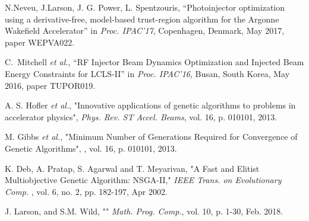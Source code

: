 \documentclass[letterpaper,  %
              ]{jacow-2_3}   %
\begin{document}
\begin{thebibliography}{99}
N.Neveu, J.Larson, J. G. Power, L. Spentzouris, 
“Photoinjector optimization using a derivative-free, model-based trust-region algorithm for the Argonne Wakefield Accelerator”
in \textit{Proc. IPAC’17}, 
Copenhagen, Denmark, May 2017, 
paper WEPVA022.

C.~Mitchell \emph{et al.}, “RF Injector Beam Dynamics Optimization 
and Injected Beam Energy Constraints for LCLS-II”
in \textit{Proc. IPAC’16}, 
Busan, South Korea, May 2016, 
paper TUPOR019.

A. S. Hofler \emph{et al.},
"Innovative applications of genetic algorithms to 
problems in accelerator physics",
\emph{Phys. Rev. ST Accel. Beams}, vol. 16,
p. 010101, 2013.

M. Gibbs \emph{et al.},
"Minimum Number of Generations Required 
for Convergence of Genetic Algorithms",
\emph{}, vol. 16,
p. 010101, 2013.

K. Deb, A. Pratap, S. Agarwal and T. Meyarivan, 
"A Fast and Elitist Multiobjective Genetic Algorithm: NSGA-II," 
\emph{IEEE Trans. on Evolutionary Comp.} , 
vol. 6, no. 2, pp. 182-197, Apr 2002.

J. Larson, and S.M. Wild, ""
\emph{Math. Prog. Comp.}, vol. 10, 
p. 1-30, Feb. 2018. 

\end{thebibliography}
\end{document}
